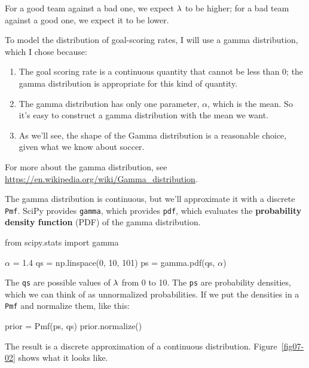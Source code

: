 \documentclass[12pt]{book}
\theoremstyle{exercise}
\newcommand{\py}[1]{{\tt #1}}%
\begin{document}
For a good team against a bad one, we expect $\mathtt{\lambda}$ to be higher; for a bad team against a good one, we expect it to be lower.

To model the distribution of goal-scoring rates, I will use a gamma distribution, which I chose because:

\begin{enumerate}

\item The goal scoring rate is a continuous quantity that cannot be less than 0; the gamma distribution is appropriate for this kind of quantity.

\item The gamma distribution has only one parameter, $\alpha$, which is the mean.  So it's easy to construct a gamma distribution with the mean we want.

\item As we'll see, the shape of the Gamma distribution is a reasonable choice, given what we know about soccer.

\end{enumerate}

For more about the gamma distribution, see \url{https://en.wikipedia.org/wiki/Gamma_distribution}.

The gamma distribution is continuous, but we'll approximate it with a discrete \py{Pmf}.
SciPy provides \py{gamma}, which provides \py{pdf}, which evaluates the {\bf probability density function} (PDF) of the gamma distribution.

\newcommand{\alf}{\mathtt{\alpha}}

\begin{code}
from scipy.stats import gamma

$\alf$ = 1.4
qs = np.linspace(0, 10, 101)
ps = gamma.pdf(qs, $\alf$)
\end{code}

The \py{qs} are possible values of $\mathtt{\lambda}$ from 0 to 10.
The \py{ps} are probability densities, which we can think of as unnormalized probabilities.
If we put the densities in a \py{Pmf} and normalize them, like this:

\begin{code}
prior = Pmf(ps, qs)
prior.normalize()
\end{code}

The result is a discrete approximation of a continuous distribution.
Figure~\ref{fig07-02} shows what it looks like.
\end{document}
